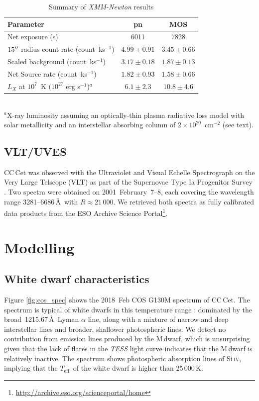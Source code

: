 \documentclass[fleqn,usenatbib]{mnras}
\newcommand{\Ion}[2]{#1{\,\textsc{#2}}}
\newcommand{\Teff}{\mbox{$T_{\mathrm{eff}}$}}
\begin{document}
\begin{table} 
\setlength{\tabcolsep}{4pt} %
\caption{Summary of {\it XMM-Newton} results}
\begin{tabular}{lcc}
\hline
Parameter & pn & MOS\\
\hline 
Net exposure (s) & 6011 & 7828 \\
$15\hbox{$^{\prime\prime}$}$ radius count rate  (count~ks$^{-1}$) & $4.99\pm 0.91$ & $3.45\pm 0.66$ \\
Scaled background (count~ks$^{-1}$) & $3.17\pm 0.18$ &  $1.87\pm 0.13$\\
Net Source rate (count~ks$^{-1}$) & $1.82\pm 0.93$ & $1.58\pm 0.66$ \\
$L_X$ at $10^7$~K $(10^{27}$ erg s$^{-1}$)$^a$ & $6.1\pm 2.3$& $10.8\pm 4.6$\\
\hline
\end{tabular} 
\label{t:xmm} \\
{\footnotesize $^a$X-ray luminosity assuming an optically-thin plasma radiative loss model with solar metallicity and an interstellar absorbing column of $2\times 10^{20}$~cm$^{-2}$ (see text).}
\end{table} 

\subsection{VLT/UVES}
CC\,Cet was observed with the Ultraviolet and Visual Echelle Spectrograph \citep[UVES,][]{Dekkeretal00-1} on the Very Large Telscope (VLT) as part of the Supernovae Type Ia Progenitor Survey  \citep[SPY,][]{napiwotzkietal20-1, koesteretal09-2}. Two spectra were obtained on 2001~February~7--8, each covering the wavelength range 3281--6686\,\AA\ with $R\approx21\,000$. We retrieved both spectra as fully calibrated data products from the ESO Archive Science Portal\footnote{\url{http://archive.eso.org/scienceportal/home}}.


\section{Modelling}
\label{sec:models}
\subsection{White dwarf characteristics}
\label{sec:wdparams}
Figure \ref{fig:cos_spec} shows the 2018~Feb COS G130M spectrum of CC\,Cet. The spectrum is typical of white dwarfs in this temperature range \citep{koesteretal14-1}: dominated by the broad \,1215.67\,\AA\ Lyman $\alpha$ line, along with a mixture of narrow and deep interstellar lines and broader, shallower photospheric lines. We detect no contribution from emission lines produced by the M\,dwarf, which is unsurprising given that the lack of flares in the \textit{TESS} light curve indicates that the M\,dwarf is relatively inactive. The spectrum shows photospheric absorption lines of \Ion{Si}{iv}, implying that the \Teff\ of the white dwarf is higher than 25\,000\,K.
\end{document}
